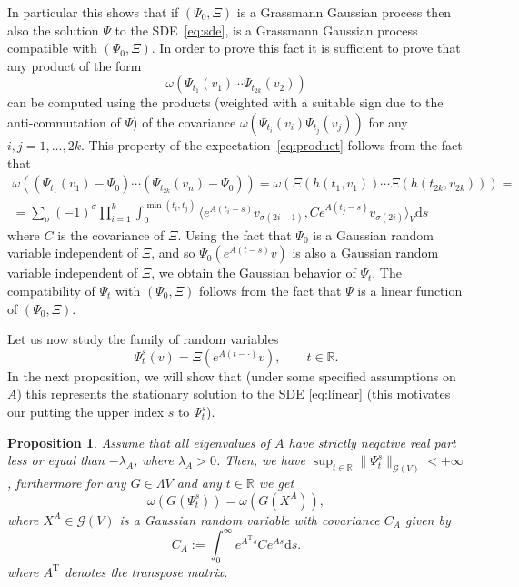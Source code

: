 \documentclass{article}
\newcommand{\Tau}{\mathrm{T}}
\newcommand{\assign}{:=}
\newcommand{\mathd}{\mathrm{d}}
\newtheorem{proposition}[theorem]{Proposition}
{\theorembodyfont{\rmfamily}\newtheorem{remark}[theorem]{Remark}}
\begin{document}
\begin{remark}
  In particular this shows that if $(\Psi_0, \Xi)$ is a Grassmann Gaussian
  process then also the solution $\Psi$ to the SDE~{\eqref{eq:sde}}, is a
  Grassmann Gaussian process compatible with $(\Psi_0, \Xi)$. In order to
  prove this fact it is sufficient to prove that any product of the form
  \begin{equation}
    \omega (\Psi_{t_1} (v_1) \cdots \Psi_{t_{2 k}} (v_2)) \label{eq:product}
  \end{equation}
  can be computed using the products (weighted with a suitable sign due to the
  anti-commutation of $\Psi$) of the covariance $\omega (\Psi_{t_i} (v_i)
  \Psi_{t_j} (v_j))$ for any $i, j = 1, \ldots, 2 k$. This property of the
  expectation~{\eqref{eq:product}} follows from the fact that
  \[ \begin{array}{c}
       \omega ((\Psi_{t_1} (v_1) - \Psi_0) \cdots (\Psi_{t_{2 k}} (v_n) -
       \Psi_0)) = \omega (\Xi (h (t_1, v_1)) \cdots \Xi (h (t_{2 k}, v_{2
       k}))) =\\
       = \sum_{\sigma} (- 1)^{\sigma} \prod_{i = 1}^k \int_0^{\min (t_i, t_j)}
       \langle e^{A (t_i - s)} v_{\sigma (2 i - 1)}, C e^{A (t_j - s)}
       v_{\sigma (2 i)} \rangle_V \mathd s
     \end{array} \]
  where $C$ is the covariance of $\Xi$. Using the fact that $\Psi_0$ is a
  Gaussian random variable independent of $\Xi$, and so $\Psi_0 (e^{A (t - s)}
  v)$ is also a Gaussian random variable independent of $\Xi$, we obtain the
  Gaussian behavior of $\Psi_t$. The compatibility of $\Psi_t$ with $(\Psi_0,
  \Xi)$ follows from the fact that $\Psi$ is a linear function of $(\Psi_0,
  \Xi) .$
\end{remark}

Let us now study the family of random variables
\[ \Psi_t^s (v) = \Xi (e^{A (t - \cdot)} v), \qquad t \in \mathbb{R}. \]
In the next proposition, we will show that (under some specified assumptions
on $A$) this represents the stationary solution to the SDE {\eqref{eq:linear}}
(this motivates our putting the upper index $s$ to $\Psi^s_t$).

\begin{proposition}
  \label{proposition_linearlimit}Assume that all eigenvalues of $A$ have
  strictly negative real part less or equal than $- \lambda_A$, where
  $\lambda_A > 0$. Then, we have $\sup_{t \in \mathbb{R}} \| \Psi^s_t
  \|_{\mathcal{G} (V)} < + \infty$, furthermore for any $G \in \Lambda V$ and
  any $t \in \mathbb{R}$ we get
  \begin{equation}
    \omega (G (\Psi^s_t)) = \omega (G (X^A)), \label{eq:G}
  \end{equation}
  where $X^A \in \mathcal{G} (V)$ is a Gaussian random variable with
  covariance $C_A$ given by
  \begin{equation}
    C_A \assign \int^{\infty}_0 e^{A^{\Tau} s} C e^{A s} \mathd s.
    \label{eq:ca}
  \end{equation}
  where $A^{\Tau}$ denotes the transpose matrix.
\end{proposition}
\end{document}

